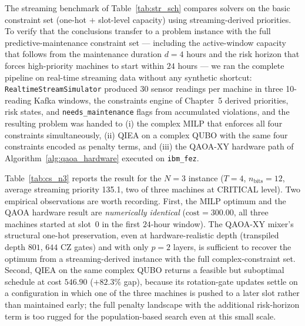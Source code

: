 The streaming benchmark of Table~\ref{tab:str_sch} compares solvers on the basic constraint set (one-hot $+$ slot-level capacity) using streaming-derived priorities. To verify that the conclusions transfer to a problem instance with the full predictive-maintenance constraint set --- including the active-window capacity that follows from the maintenance duration $d=4$ hours and the risk horizon that forces high-priority machines to start within $24$ hours --- we ran the complete pipeline on real-time streaming data without any synthetic shortcut: \texttt{RealtimeStreamSimulator} produced 30 sensor readings per machine in three 10-reading Kafka windows, the constraints engine of Chapter~5 derived priorities, risk states, and \texttt{needs\_maintenance} flags from accumulated violations, and the resulting problem was handed to (i) the complex MILP that enforces all four constraints simultaneously, (ii) QIEA on a complex QUBO with the same four constraints encoded as penalty terms, and (iii) the QAOA-XY hardware path of Algorithm~\ref{alg:qaoa_hardware} executed on \texttt{ibm\_fez}.

Table~\ref{tab:cs_n3} reports the result for the $N=3$ instance ($T=4$, $n_{\text{bits}}=12$, average streaming priority 135.1, two of three machines at CRITICAL level). Two empirical observations are worth recording. First, the MILP optimum and the QAOA hardware result are \emph{numerically identical} ($\text{cost} = 300.00$, all three machines started at slot~0 in the first $24$-hour window). The QAOA-XY mixer's structural one-hot preservation, even at hardware-realistic depth (transpiled depth $801$, $644$ CZ gates) and with only $p=2$ layers, is sufficient to recover the optimum from a streaming-derived instance with the full complex-constraint set. Second, QIEA on the same complex QUBO returns a feasible but suboptimal schedule at cost $546.90$ ($+82.3\%$ gap), because its rotation-gate updates settle on a configuration in which one of the three machines is pushed to a later slot rather than maintained early; the full penalty landscape with the additional risk-horizon term is too rugged for the population-based search even at this small scale.

